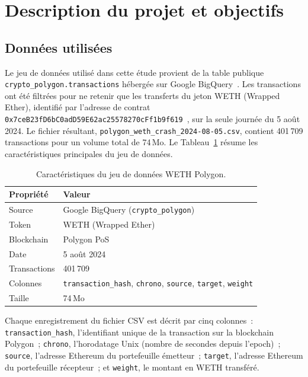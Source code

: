 
\section{Description du projet et objectifs}
\label{sec:description}

\subsection{Donn\'ees utilis\'ees}
\label{sec:description_donnees}

Le jeu de donn\'ees utilis\'e dans cette \'etude provient de la table publique
\texttt{crypto\_polygon\allowbreak .transactions} h\'eberg\'ee sur Google
BigQuery~\cite{bigquery_public}. Les transactions ont \'et\'e filtr\'ees pour ne
retenir que les transferts du jeton WETH (Wrapped Ether), identifi\'e par
l'adresse de contrat \texttt{0x7ceB23fD6bC0adD59E62\allowbreak ac25578270cFf1b9f619}~\cite{weth_polygon}, sur la
seule journ\'ee du 5 ao\^ut 2024. Le fichier r\'esultant,
\texttt{polygon\_weth\_crash\_2024-08-05.csv}, contient 401\,709 transactions
pour un volume total de 74\,Mo. Le Tableau~\ref{tab:dataset} r\'esume les
caract\'eristiques principales du jeu de donn\'ees.

\begin{table}[H]
\centering
\caption{Caract\'eristiques du jeu de donn\'ees WETH Polygon.}
\label{tab:dataset}
\begin{tabular}{ll}
\toprule
Propri\'et\'e & Valeur \\
\midrule
Source & Google BigQuery (\texttt{crypto\_polygon}) \\
Token & WETH (Wrapped Ether) \\
Blockchain & Polygon PoS \\
Date & 5 ao\^ut 2024 \\
Transactions & 401\,709 \\
Colonnes & \texttt{transaction\_hash}, \texttt{chrono}, \texttt{source}, \texttt{target}, \texttt{weight} \\
Taille & 74\,Mo \\
\bottomrule
\end{tabular}
\end{table}

Chaque enregistrement du fichier CSV est d\'ecrit par cinq colonnes~:
\texttt{transaction\_hash}, l'identifiant unique de la transaction sur la
blockchain Polygon~; \texttt{chrono}, l'horodatage Unix (nombre de secondes
depuis l'epoch)~; \texttt{source}, l'adresse Ethereum du portefeuille
\'emetteur~; \texttt{target}, l'adresse Ethereum du portefeuille r\'ecepteur~;
et \texttt{weight}, le montant en WETH transf\'er\'e.

